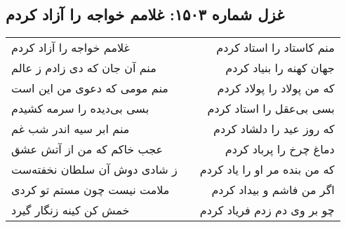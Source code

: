 \begin{center}
\section*{غزل شماره ۱۵۰۳: غلامم خواجه را آزاد کردم}
\label{sec:1503}
\begin{longtable}{l p{0.5cm} r}
غلامم خواجه را آزاد کردم
&&
منم کاستاد را استاد کردم
\\
منم آن جان که دی زادم ز عالم
&&
جهان کهنه را بنیاد کردم
\\
منم مومی که دعوی من این است
&&
که من پولاد را پولاد کردم
\\
بسی بی‌دیده را سرمه کشیدم
&&
بسی بی‌عقل را استاد کردم
\\
منم ابر سیه اندر شب غم
&&
که روز عید را دلشاد کردم
\\
عجب خاکم که من از آتش عشق
&&
دماغ چرخ را پرباد کردم
\\
ز شادی دوش آن سلطان نخفته‌ست
&&
که من بنده مر او را یاد کردم
\\
ملامت نیست چون مستم تو کردی
&&
اگر من فاشم و بیداد کردم
\\
خمش کن کینه زنگار گیرد
&&
چو بر وی دم زدم فریاد کردم
\\
\end{longtable}
\end{center}

